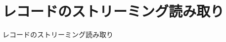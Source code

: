 \documentclass[../../../main]{subfiles}
\begin{document}
    \section{レコードのストリーミング読み取り}\label{sec:phraseology-record_streaming_read}

    レコードのストリーミング読み取り
\end{document}
